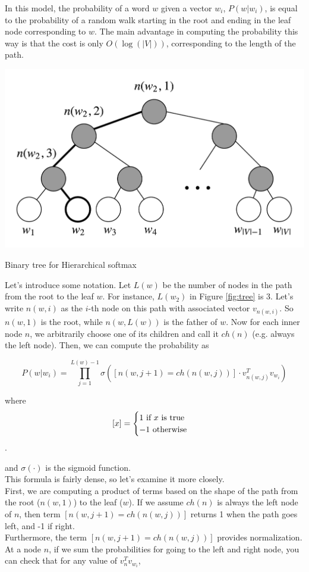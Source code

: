 \documentclass[nobib]{tufte-handout}
\begin{document}
In this model, the probability of a word $ w $ given a vector $ w_i $, $ P(w | w_i) $, is equal to the probability of a random walk starting in the root and ending in the leaf node corresponding to $ w $. The main advantage in computing the probability this way is that the cost is only $ O(\log(|V|))$, corresponding to the length of the path. 

\begin{marginfigure}%
  \includegraphics[width=\linewidth]{tree}
  \caption{Binary tree for Hierarchical softmax}
  \label{fig:tree}
\end{marginfigure}


Let's introduce some notation. Let $ L(w) $ be the number of nodes in the path from the root to the leaf $ w $. For instance, $L(w_2)$ in Figure \ref{fig:tree} is 3.  Let's write $ n(w, i) $ as the $i$-th node on this path with associated vector $ v_{n(w,i)}  $. So $n(w, 1)$ is the root, while $n(w, L(w))$ is the father of $ w $. Now for each inner node $ n $, we arbitrarily choose one of its children and call it $ ch(n) $ (e.g. always the left node). Then, we can compute the probability as 

$$ P(w | w_i) = \prod_{j=1}^{L(w) - 1} \sigma([n(w, j+1) = ch(n(w, j))] \cdot v_{n(w,j)}^T v_{w_i})  $$

where $$[x]  = \begin{cases}
1 \text{ if $ x $ is true}\\
-1 \text{ otherwise}
\end{cases} $$.

and $\sigma(\cdot)$ is the sigmoid function. \\
This formula is fairly dense, so let's examine it more closely. 
\\ First, we are computing a product of terms based on the shape of the path from the root ($n(w,1)$) to the leaf ($w$). If we assume $ch(n)$ is always the left node of $n$, then term $ [n(w, j+1) = ch(n(w, j))]$ returns 1 when the path goes left, and -1 if right.  \\
Furthermore, the term $ [n(w, j+1) = ch(n(w, j))]$ provides normalization. At a node $ n $, if we sum the probabilities for going to the left and right node, you can check that for any value of $v_n^T v_{w_i}$, 
\end{document}
